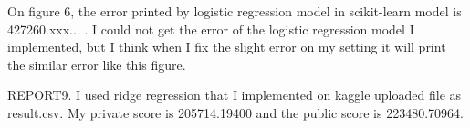 \documentclass[a4 paper]{article}
\numberwithin{equation}{section}
\newcommand{\0}{\mathbf{0}}
\begin{document}
On figure 6, the error printed by logistic regression model in scikit-learn model is 427260.xxx... . I could not get the error of the logistic regression model I implemented, but I think when I fix the slight error on my setting it will print the similar error like this figure.

REPORT9.
I used ridge regression that I implemented on kaggle uploaded file as result.csv.
My private score is 205714.19400 and the public score is 223480.70964. 
\end{document}
